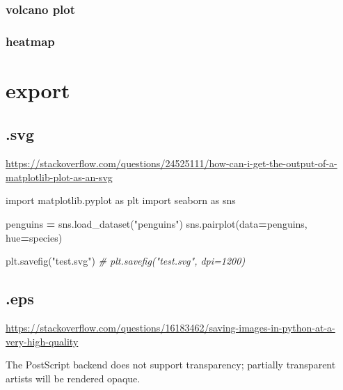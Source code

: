 \documentclass[
]{book}
\newenvironment{Shaded}{\begin{snugshade}}{\end{snugshade}}
\newcommand{\CommentTok}[1]{\textcolor[rgb]{0.56,0.35,0.01}{\textit{#1}}}
\newcommand{\ImportTok}[1]{#1}
\newcommand{\NormalTok}[1]{#1}
\newcommand{\OperatorTok}[1]{\textcolor[rgb]{0.81,0.36,0.00}{\textbf{#1}}}
\newcommand{\StringTok}[1]{\textcolor[rgb]{0.31,0.60,0.02}{#1}}
\theoremstyle{definition}
\theoremstyle{definition}
\theoremstyle{definition}
\theoremstyle{definition}
\theoremstyle{remark}
\begin{document}
\hypertarget{volcano-plot}{%
\subsubsection{volcano plot}\label{volcano-plot}}

\hypertarget{heatmap}{%
\subsubsection{heatmap}\label{heatmap}}

\hypertarget{export}{%
\section{export}\label{export}}

\hypertarget{svg-1}{%
\subsection{.svg}\label{svg-1}}

\url{https://stackoverflow.com/questions/24525111/how-can-i-get-the-output-of-a-matplotlib-plot-as-an-svg}

\begin{Shaded}
\begin{Highlighting}[]
\ImportTok{import}\NormalTok{ matplotlib.pyplot }\ImportTok{as}\NormalTok{ plt}
\ImportTok{import}\NormalTok{ seaborn }\ImportTok{as}\NormalTok{ sns}

\NormalTok{penguins }\OperatorTok{=}\NormalTok{ sns.load\_dataset(}\StringTok{"penguins"}\NormalTok{)}
\NormalTok{sns.pairplot(data}\OperatorTok{=}\NormalTok{penguins,}
\NormalTok{             hue}\OperatorTok{=}\StringTok{\textquotesingle{}species\textquotesingle{}}\NormalTok{)}

\NormalTok{plt.savefig(}\StringTok{"test.svg"}\NormalTok{)}
\CommentTok{\# plt.savefig("test.svg", dpi=1200)}
\end{Highlighting}
\end{Shaded}

\hypertarget{eps}{%
\subsection{.eps}\label{eps}}

\url{https://stackoverflow.com/questions/16183462/saving-images-in-python-at-a-very-high-quality}

The PostScript backend does not support transparency; partially transparent artists will be rendered opaque.
\end{document}
